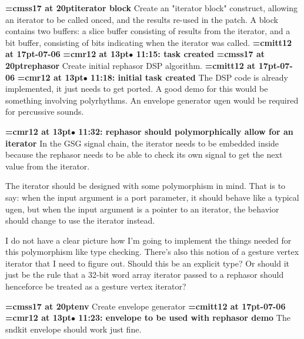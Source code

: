{\medskip\noindent\bf\font\titlefont=cmss17 at 20pt\titlefont iterator block}\medskip
Create an "iterator block" construct, allowing
an iterator to be called onced, and the results
re-used in the patch. A block contains two buffers:
a slice buffer consisting of results from the iterator,
and a bit buffer, consisting of bits indicating when the
iterator was called.
{\medskip\noindent\bf\font\titlefont=cmitt12 at 17pt-07-06}\medskip
{\smallskip\noindent\bf\font\titlefont=cmr12 at 13pt\titlefont $\bullet$ 11:15: task created}\smallskip
{}
{\medskip\noindent\bf\font\titlefont=cmss17 at 20pt\titlefont rephasor}\medskip
Create initial rephasor DSP algorithm.
{\medskip\noindent\bf\font\titlefont=cmitt12 at 17pt-07-06}\medskip
{\smallskip\noindent\bf\font\titlefont=cmr12 at 13pt\titlefont $\bullet$ 11:18: initial task created}\smallskip
The DSP code is already implemented, it just needs to get ported. A good demo for this would be something involving polyrhythms. An envelope generator ugen would be required for percussive sounds.
\par

{\smallskip\noindent\bf\font\titlefont=cmr12 at 13pt\titlefont $\bullet$ 11:32: rephasor should polymorphically allow for an iterator}\smallskip
In the GSG signal chain, the iterator needs to be embedded inside because the rephasor needs to be able to check its own signal to get the next value from the iterator.
\par

The iterator should be designed with some polymorphism in mind. That is to say: when the input argument is a port parameter, it should behave like a typical ugen, but when the input argument is a pointer to an iterator, the behavior should change to use the iterator instead.
\par

I do not have a clear picture how I'm going to implement the things needed for this polymorphism like type checking. There's also this notion of a gesture vertex iterator that I need to figure out. Should this be an explicit type? Or should it just be the rule that a 32-bit word array iterator passed to a rephasor should henceforce be treated as a gesture vertex iterator?
\par

{\medskip\noindent\bf\font\titlefont=cmss17 at 20pt\titlefont env}\medskip
Create envelope generator
{\medskip\noindent\bf\font\titlefont=cmitt12 at 17pt-07-06}\medskip
{\smallskip\noindent\bf\font\titlefont=cmr12 at 13pt\titlefont $\bullet$ 11:23: envelope to be used with rephasor demo}\smallskip
The sndkit envelope should work just fine.
\par


